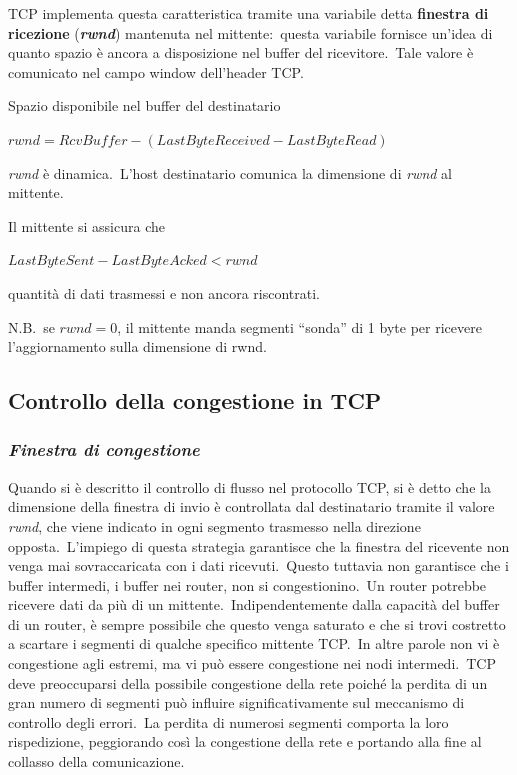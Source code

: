 TCP implementa questa caratteristica tramite una variabile detta \textbf{finestra di ricezione} (\textbf{\emph{rwnd}}) mantenuta nel mittente:\ questa variabile fornisce un'idea di quanto spazio è ancora a disposizione nel buffer del ricevitore.\
Tale valore è comunicato nel campo window dell'header TCP.

Spazio disponibile nel buffer del destinatario

\begin{center}
    $rwnd=RcvBuffer - (LastByteReceived - LastByteRead)$
\end{center}
\emph{rwnd} è dinamica.\
L'host destinatario comunica la dimensione di \emph{rwnd} al mittente.

Il mittente si assicura che
\begin{center}
    $LastByteSent-LastByteAcked < rwnd$
\end{center}
quantità di dati trasmessi e non ancora riscontrati.

N.B.\
se $rwnd=0$, il mittente manda segmenti ``sonda'' di 1 byte per ricevere l'aggiornamento sulla dimensione di rwnd.

\subsection{Controllo della congestione in TCP}

\subsubsection{\emph{Finestra di congestione}}

Quando si è descritto il controllo di flusso nel protocollo TCP, si è detto che la dimensione della finestra di invio è controllata dal destinatario tramite il valore \emph{rwnd}, che viene indicato in ogni segmento trasmesso nella direzione opposta.\
L'impiego di questa strategia garantisce che la finestra del ricevente non venga mai sovraccaricata con i dati ricevuti.\
Questo tuttavia non garantisce che i buffer intermedi, i buffer nei router, non si congestionino.\
Un router potrebbe ricevere dati da più di un mittente.\
Indipendentemente dalla capacità del buffer di un router, è sempre possibile che questo venga saturato e che si trovi costretto a scartare i segmenti di qualche specifico mittente TCP.\
In altre parole non vi è congestione agli estremi, ma vi può essere congestione nei nodi intermedi.\
TCP deve preoccuparsi della possibile congestione della rete poiché la perdita di un gran numero di segmenti può influire significativamente sul meccanismo di controllo degli errori.\
La perdita di numerosi segmenti comporta la loro rispedizione, peggiorando così la congestione della rete e portando alla fine al collasso della comunicazione.

